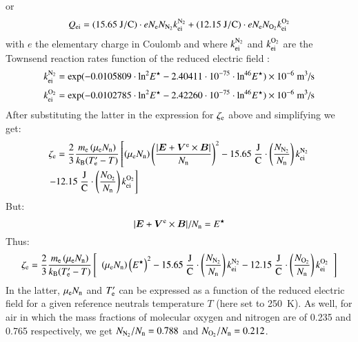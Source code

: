 \documentclass{warpdoc}
\newcommand{\alb}{\vspace{0.1cm}\\} %
\newcommand{\mfd}{\displaystyle}
\renewcommand{\vec}[1]{\bm{#1}}
\begin{document}
%
or
%
\begin{equation} 
 \begin{array}{r}\mfd
 Q_{\rm ei}= (15.65{\rm ~J/C}) \cdot e N_{\rm e} N_{\rm N_2} k_{\rm ei}^{\rm N_2}
           + (12.15{\rm ~J/C}) \cdot e N_{\rm e} N_{\rm O_2} k_{\rm ei}^{\rm O_2}
 \end{array}
\end{equation}
%
with $e$ the elementary charge in Coulomb and where $k_{\rm ei}^{\rm N_2}$ and $k_{\rm ei}^{\rm O_2}$ are the Townsend reaction rates function of the reduced electric field \cite{jcp:2014:parent}:
%
\begin{equation}
 k_{\rm ei}^{\rm N_2}={\rm exp}(-0.0105809\cdot {\rm ln}^2 E^\star - 2.40411\cdot 10^{-75} \cdot {\rm ln}^{46}E^\star)\times 10^{-6}~\textrm{m$^3$/s}
\label{eqn:keiN2}
\end{equation}
%
%
\begin{equation}
 k_{\rm ei}^{\rm O_2}= {\rm exp}(-0.0102785\cdot {\rm ln}^2 E^\star - 2.42260\cdot 10^{-75} \cdot {\rm ln}^{46}E^\star)\times 10^{-6}~\textrm{m$^3$/s}
\label{eqn:keiO2}
\end{equation}
%
After substituting the latter in the expression for $\zeta_{\rm e}$ above and simplifying we get:
%
\begin{equation}
\begin{array}{l}\mfd
\zeta_{\rm e} 
=
 \frac{2}{3} \frac{m_{\rm e} \left(\mu_{\rm e} N_{\rm n}\right)}{k_{\rm B} (T_{\rm e}^\prime-T)} 
\left[  
  \left(\mu_{\rm e} N_{\rm n}\right)  \left( \frac{|\vec{E}+\vec{V}^{\rm e}\times \vec{B}|}{N_{\rm n}}\right)^2
 -15.65~\frac{\rm J}{\rm C}\cdot \left( \frac{N_{\rm N_2}}{N_{\rm n}}\right)  k_{\rm ei}^{\rm N_2} \right.
\alb\mfd
 \left. -12.15~\frac{\rm J}{\rm C}\cdot \left( \frac{N_{\rm O_2}}{N_{\rm n}}\right) k_{\rm ei}^{\rm O_2}
 \right]
\end{array}
 \end{equation}
%
But:
\begin{equation}
|\vec{E}+\vec{V}^{\rm e} \times \vec{B}|/N_{\rm n}=E^\star
\end{equation}
%
Thus:
%
\begin{equation}
\zeta_{\rm e} 
=
 \frac{2}{3} \frac{m_{\rm e} \left(\mu_{\rm e} N_{\rm n}\right)}{k_{\rm B} (T_{\rm e}^\prime-T)} 
\left[  
\begin{array}{r}\mfd
  \left(\mu_{\rm e} N_{\rm n}\right)  \left(E^\star\right)^2
 -15.65~\frac{\rm J}{\rm C}\cdot \left( \frac{N_{\rm N_2}}{N_{\rm n}}\right)  k_{\rm ei}^{\rm N_2}
 -12.15~\frac{\rm J}{\rm C}\cdot \left( \frac{N_{\rm O_2}}{N_{\rm n}}\right) k_{\rm ei}^{\rm O_2}
 \end{array}
 \right]
 \label{eqn:zetae2}
 \end{equation}
%
In the latter, $\mu_{\rm e} N_{\rm n}$ and $T_{\rm e}^\prime$ can be expressed as a function of the reduced electric field for a given reference neutrals temperature $T$ (here set to 250~K). As well, for air in which the mass fractions of molecular oxygen and nitrogen are of 0.235 and 0.765 respectively, we get ${N_{\rm N_2}}/{N_{\rm n}}=0.788$ and ${N_{\rm O_2}}/{N_{\rm n}}=0.212$. 
\end{document}
